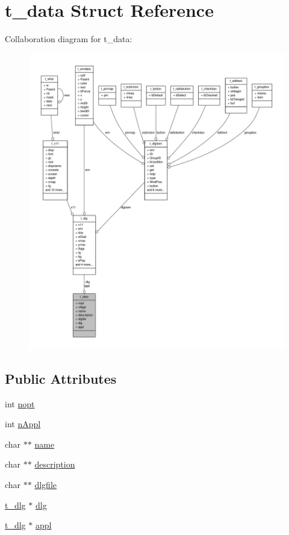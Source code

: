 \hypertarget{structt__data}{\section{t\-\_\-data \-Struct \-Reference}
\label{structt__data}
}


\-Collaboration diagram for t\-\_\-data\-:
\nopagebreak
\begin{figure}[H]
\begin{center}
\leavevmode
\includegraphics[width=350pt]{structt__data__coll__graph}
\end{center}
\end{figure}
\subsection*{\-Public \-Attributes}
\begin{DoxyCompactItemize}
\item 
int \hyperlink{structt__data_ab10ce01574cfa4d14c85be018d2cb25b}{nopt}
\item 
int \hyperlink{structt__data_afb46df65d1cfc7fed2f8248047cda71a}{n\-Appl}
\item 
char $\ast$$\ast$ \hyperlink{structt__data_a77c84745a9370ffb8704ac4ec2ac8062}{name}
\item 
char $\ast$$\ast$ \hyperlink{structt__data_ae84609c05b25b39fdb01e01053210fd5}{description}
\item 
char $\ast$$\ast$ \hyperlink{structt__data_a04baabe685184d0f295cab4cd866df79}{dlgfile}
\item 
\hyperlink{structt__dlg}{t\-\_\-dlg} $\ast$ \hyperlink{structt__data_a4ecdb1d6b2c8eaccbce579994240a2e1}{dlg}
\item 
\hyperlink{structt__dlg}{t\-\_\-dlg} $\ast$ \hyperlink{structt__data_a3b0673ce6ff70cdc856cac28f0de63c6}{appl}
\end{DoxyCompactItemize}


